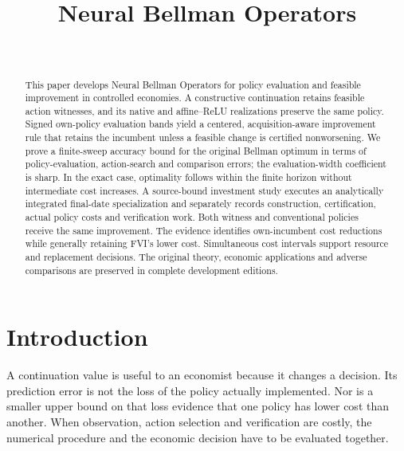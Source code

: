 \documentclass[ecta,nameyear,draft]{econsocart}
\begin{document}
\begin{frontmatter}
\title{Neural Bellman Operators}
\begin{aug}
\author[id=au1,addressref={add1}]{~}
\address[id=add1]{Peking University}
\end{aug}
\begin{abstract}
This paper develops Neural Bellman Operators for policy evaluation and feasible improvement in controlled economies. A constructive continuation retains feasible action witnesses, and its native and affine--ReLU realizations preserve the same policy. Signed own-policy evaluation bands yield a centered, acquisition-aware improvement rule that retains the incumbent unless a feasible change is certified nonworsening. We prove a finite-sweep accuracy bound for the original Bellman optimum in terms of policy-evaluation, action-search and comparison errors; the evaluation-width coefficient is sharp. In the exact case, optimality follows within the finite horizon without intermediate cost increases. A source-bound investment study executes an analytically integrated final-date specialization and separately records construction, certification, actual policy costs and verification work. Both witness and conventional policies receive the same improvement. The evidence identifies own-incumbent cost reductions while generally retaining FVI's lower cost. Simultaneous cost intervals support resource and replacement decisions. The original theory, economic applications and adverse comparisons are preserved in complete development editions.
\end{abstract}
\begin{keyword}
\end{keyword}
\end{frontmatter}
\section{Introduction}\label{sec:introduction49}
A continuation value is useful to an economist because it changes a decision. Its prediction error is not the loss of the policy actually implemented. Nor is a smaller upper bound on that loss evidence that one policy has lower cost than another. When observation, action selection and verification are costly, the numerical procedure and the economic decision have to be evaluated together.
\end{document}
